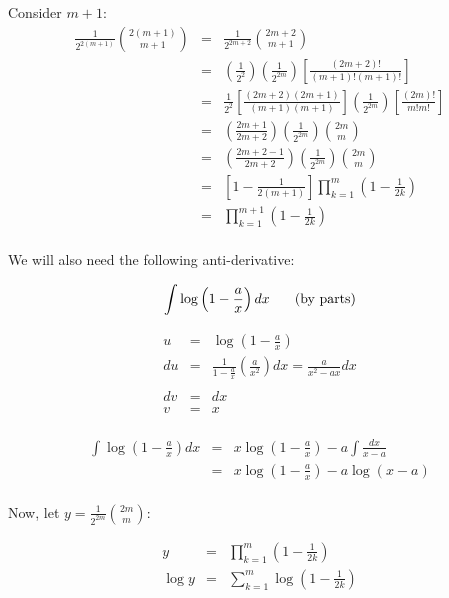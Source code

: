 \documentclass[letterpaper,12pt,fleqn]{article}
\begin{document}
\begin{enumerate}
\begin{theproof}[by induction on $m$]
\begin{description}
\item{Consider $m+1$:}
\begin{eqnarray*}
\frac{1}{2^{2(m+1)}}\binom{2(m+1)}{m+1} &=&
    \frac{1}{2^{2m+2}}\binom{2m+2}{m+1} \\
    &=& \left(\frac{1}{2^2}\right)\left(\frac{1}{2^{2m}}\right)
    \left[\frac{(2m+2)!}{(m+1)!(m+1)!}\right] \\
    &=& \frac{1}{2^2}\left[\frac{(2m+2)(2m+1)}{(m+1)(m+1)}\right]
    \left(\frac{1}{2^{2m}}\right)\left[\frac{(2m)!}{m!m!}\right] \\
    &=& \left(\frac{2m+1}{2m+2}\right)
    \left(\frac{1}{2^{2m}}\right)\binom{2m}{m} \\
    &=& \left(\frac{2m+2-1}{2m+2}\right)
    \left(\frac{1}{2^{2m}}\right)\binom{2m}{m} \\
    &=& \left[1-\frac{1}{2(m+1)}\right]
    \prod_{k=1}^{m}\left(1-\frac{1}{2k}\right) \\
    &=& \prod_{k=1}^{m+1}\left(1-\frac{1}{2k}\right) \\
\end{eqnarray*}

\end{description}
\end{theproof}

We will also need the following anti-derivative:

\[\int\log\left(1-\frac{a}{x}\right)dx\hspace{0.25in}\mbox{(by parts)}\]

\begin{eqnarray*}
u &=& \log\left(1-\frac{a}{x}\right) \\
du &=& \frac{1}{1-\frac{a}{x}}\left(\frac{a}{x^2}\right)dx=
    \frac{a}{x^2-ax}dx \\
\\
dv &=& dx \\
v &=& x \\
\end{eqnarray*}

\begin{eqnarray*}
\int\log\left(1-\frac{a}{x}\right)dx &=&
    x\log\left(1-\frac{a}{x}\right)-a\int\frac{dx}{x-a} \\
    &=& x\log\left(1-\frac{a}{x}\right)-a\log(x-a) \\
\end{eqnarray*}

Now, let $y=\frac{1}{2^{2m}}\binom{2m}{m}$:

\begin{eqnarray*}
y &=& \prod_{k=1}^{m}\left(1-\frac{1}{2k}\right) \\
\log y &=& \sum_{k=1}^{m}\log\left(1-\frac{1}{2k}\right) \\
\end{eqnarray*}


\end{enumerate}
\end{document}
